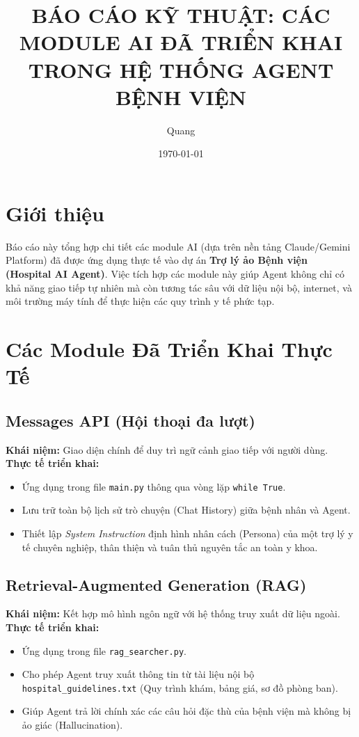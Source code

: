 \documentclass[12pt]{article}
\title{BÁO CÁO KỸ THUẬT: CÁC MODULE AI ĐÃ TRIỂN KHAI TRONG HỆ THỐNG AGENT BỆNH VIỆN}
\author{Quang}
\date{\today}
\begin{document}
\maketitle

\tableofcontents
\newpage

\section{Giới thiệu}

Báo cáo này tổng hợp chi tiết các module AI (dựa trên nền tảng Claude/Gemini Platform) đã được ứng dụng thực tế vào dự án \textbf{Trợ lý ảo Bệnh viện (Hospital AI Agent)}. Việc tích hợp các module này giúp Agent không chỉ có khả năng giao tiếp tự nhiên mà còn tương tác sâu với dữ liệu nội bộ, internet, và môi trường máy tính để thực hiện các quy trình y tế phức tạp.

\section{Các Module Đã Triển Khai Thực Tế}

\subsection{Messages API (Hội thoại đa lượt)}
\textbf{Khái niệm:} Giao diện chính để duy trì ngữ cảnh giao tiếp với người dùng.
\textbf{Thực tế triển khai:}
\begin{itemize}
    \item Ứng dụng trong file \texttt{main.py} thông qua vòng lặp \texttt{while True}.
    \item Lưu trữ toàn bộ lịch sử trò chuyện (Chat History) giữa bệnh nhân và Agent.
    \item Thiết lập \textit{System Instruction} định hình nhân cách (Persona) của một trợ lý y tế chuyên nghiệp, thân thiện và tuân thủ nguyên tắc an toàn y khoa.
\end{itemize}

\subsection{Retrieval-Augmented Generation (RAG)}
\textbf{Khái niệm:} Kết hợp mô hình ngôn ngữ với hệ thống truy xuất dữ liệu ngoài.
\textbf{Thực tế triển khai:}
\begin{itemize}
    \item Ứng dụng trong file \texttt{rag\_searcher.py}.
    \item Cho phép Agent truy xuất thông tin từ tài liệu nội bộ \texttt{hospital\_guidelines.txt} (Quy trình khám, bảng giá, sơ đồ phòng ban).
    \item Giúp Agent trả lời chính xác các câu hỏi đặc thù của bệnh viện mà không bị ảo giác (Hallucination).
\end{itemize}
\end{document}
